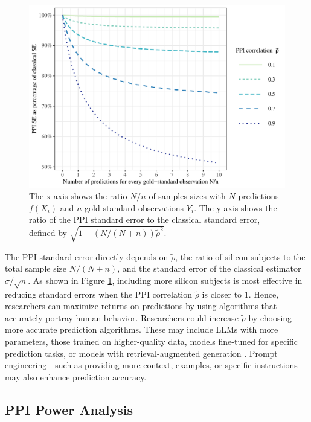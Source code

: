 \documentclass{article}
\begin{document}
\begin{figure}[p]
    \centering
    \includegraphics[width=0.8\linewidth]{3_SeAsPercentageOfShareOfClassicSe.pdf}
    \caption{The x-axis shows the ratio $N/n$ of samples sizes with $N$ predictions $f(X_i)$ and $n$ gold standard observations $Y_i$. The y-axis shows the ratio of the PPI standard error to the classical standard error, defined by $\sqrt{1-(N/(N+n))\tilde{\rho}^2}.$ 
    }
    \label{fig:theo-ppi-classic-ci}
\end{figure}
\clearpage

The PPI standard error directly depends on $\tilde{\rho}$, the ratio of silicon subjects to the total sample size $N/(N+n)$, and the standard error of the classical estimator $\sigma/\sqrt{n}$. As shown in Figure \ref{fig:theo-ppi-classic-ci}, including more silicon subjects is most effective in reducing standard errors when the PPI correlation $\tilde{\rho}$ is closer to $1$. Hence, researchers can maximize returns on predictions by using algorithms that accurately portray human behavior. Researchers could increase $\tilde{\rho}$ by choosing more accurate prediction algorithms. These may include LLMs with more parameters, those trained on higher-quality data, models fine-tuned for specific prediction tasks, or models with retrieval-augmented generation \citep{lewis_retrieval-augmented_2021}. Prompt engineering---such as providing more context, examples, or specific instructions---may also enhance prediction accuracy. 

\subsection{PPI Power Analysis}\label{sec:PPI power}
\end{document}

